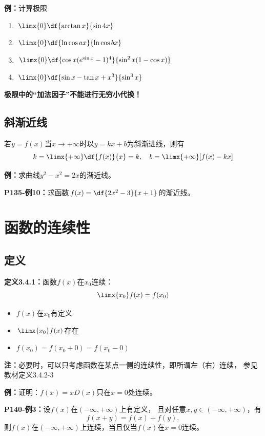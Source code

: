 {\bf 例：}计算极限
\begin{enumerate}[(1)]
  \setlength{\itemindent}{1cm}
  \item $\limx{0}\df{\arctan x}{\sin 4x}$ 
  \item $\limx{0}\df{\ln\cos ax}{\ln\cos bx}$ 
  \item $\limx{0}\df{\cos x(e^{\sin x}-1)^4}{\sin^2 x(1-\cos x)}$ 
  \item $\limx{0}\df{\sin x-\tan x+x^3}{\sin^3 x}$
\end{enumerate}

{\bf 极限中的“加法因子”不能进行无穷小代换！}

\subsection{斜渐近线}

若$y=f(x)$当$x\to+\infty$时以$y=kx+b$为斜渐进线，则有
$$k=\limx{+\infty}\df{f(x)}{x}=k,\quad b=\limx{+\infty}[f(x)-kx]$$

{\bf 例：}求曲线$y^2-x^2=2x$的渐近线。

{\bf P135-例10：}求函数$f(x)=\df{2x^2-3}{x+1}$的渐近线。

\section{函数的连续性}

\subsection{定义}

{\bf 定义3.4.1：}函数$f(x)$在$x_0$连续：
$$\limx{x_0}f(x)=f(x_0)$$

\begin{itemize}
  \item $f(x)$在$x_0$有定义 
  \item $\limx{x_0}f(x)$存在 
  \item $f(x_0)=f(x_0+0)=f(x_0-0)$
\end{itemize}

{\bf 注：}必要时，可以只考虑函数在某点一侧的连续性，即所谓左（右）连续，
参见教材定义3.4.2-3

{\bf 例：}证明：$f(x)=xD(x)$只在$x=0$处连续。

{\bf P140-例3：}设$f(x)$在$(-\infty,+\infty)$上有定义，
且对任意$x,y\in (-\infty,+\infty)$，有
$$f(x+y)=f(x)+f(y),$$
则$f(x)$在$(-\infty,+\infty)$上连续，当且仅当$f(x)$在$x=0$连续。

\begin{center}
\end{center}


